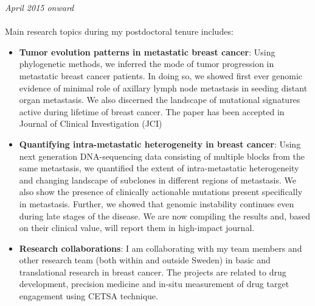 \documentclass[margin, 10pt]{res} %
\begin{document}
\begin{resume}
{\sl \textbf{}} \hfill \textit{April 2015 onward} \\
{\color{RubineRed}{Radiumhemmet, Karolinska University Hospital}} \\
Main research topics during my postdoctoral tenure includes:
\begin{itemize}
\item \textbf{Tumor evolution patterns in metastatic breast cancer}: Using phylogenetic methods, we inferred the mode of tumor progression in metastatic breast cancer patients. In doing so, we showed first ever genomic evidence of minimal role of axillary lymph node metastasis in seeding distant organ metastasis. We also discerned the landscape of mutational signatures active during lifetime of breast cancer. The paper has been accepted in Journal of Clinical Investigation (JCI)
\item \textbf{Quantifying intra-metastatic heterogeneity in breast cancer}: Using next generation DNA-sequencing data consisting of multiple blocks from the same metastasis, we quantified the extent of intra-metastatic heterogeneity and changing landscape of subclones in different regions of metastasis. We also show the presence of clinically actionable mutations present specifically in metastasis. Further, we showed that genomic instability continues even during late stages of the disease. We are now compiling the results and, based on their clinical value, will report them in high-impact journal.
\item \textbf{Research collaborations}: I am collaborating with my team members and other research team (both within and outside Sweden) in basic and translational research in breast cancer. The projects are related to drug development, precision medicine and in-situ measurement of drug target engagement using CETSA technique.
\end{itemize}



\end{resume}
\end{document}
